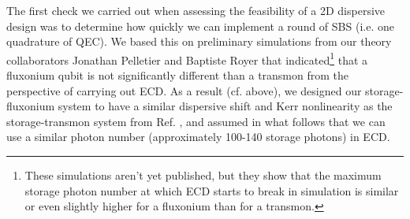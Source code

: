The first check we carried out when assessing the feasibility of a 2D dispersive design was to determine how quickly we can implement a round of SBS (i.e. one quadrature of QEC). We based this on preliminary simulations from our theory collaborators Jonathan Pelletier and Baptiste Royer that indicated\footnote{These simulations aren't yet published, but they show that the maximum storage photon number at which ECD starts to break in simulation is similar or even slightly higher for a fluxonium than for a transmon.} that a fluxonium qubit is not significantly different than a transmon from the perspective of carrying out ECD. As a result (cf. above), we designed our storage-fluxonium system to have a similar dispersive shift and Kerr nonlinearity as the storage-transmon system from Ref. \cite{sivak2023gkp-expt}, and assumed in what follows that we can use a similar photon number (approximately 100-140 storage photons) in ECD. 

